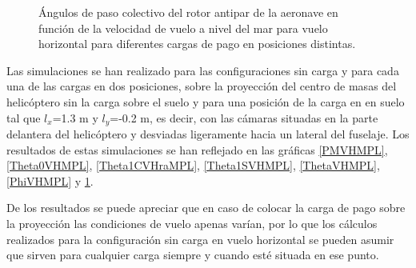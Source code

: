 \begin{figure}
	\centering
	\caption{Ángulos de paso colectivo del rotor antipar de la aeronave en función de la velocidad de vuelo a nivel del mar para vuelo horizontal para diferentes cargas de pago en posiciones distintas.}
	\label{Theta0VHraMPL}
\end{figure}

Las simulaciones se han realizado para las configuraciones sin carga y para cada una de las cargas en dos posiciones, sobre la proyección del centro de masas del helicóptero sin la carga sobre el suelo y para una posición de la carga en en suelo tal que $l_x$=1.3 m y $l_y$=-0.2 m, es decir, con las cámaras situadas en la parte delantera del helicóptero y desviadas ligeramente hacia un lateral del fuselaje. Los resultados de estas simulaciones se han reflejado en las gráficas \ref{PMVHMPL}, \ref{Theta0VHMPL}, \ref{Theta1CVHraMPL}, \ref{Theta1SVHMPL}, \ref{ThetaVHMPL}, \ref{PhiVHMPL} y \ref{Theta0VHraMPL}.

De los resultados se puede apreciar que en caso de colocar la carga de pago sobre la proyección las condiciones de vuelo apenas varían, por lo que los cálculos realizados para la configuración sin carga en vuelo horizontal se pueden asumir que sirven para cualquier carga siempre y cuando esté situada en ese punto.

